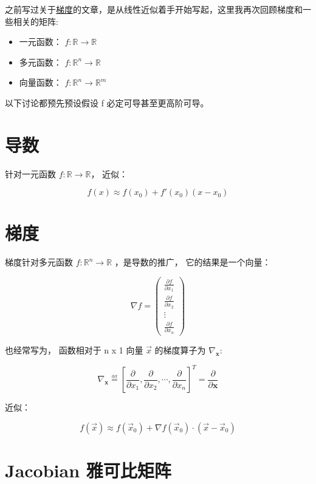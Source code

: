 \documentclass[
]{book}
\providecommand{\tightlist}{%
  \setlength{\itemsep}{0pt}\setlength{\parskip}{0pt}}
\begin{document}
之前写过关于\href{https://zhuanlan.zhihu.com/p/97545154}{梯度}的文章，是从线性近似着手开始写起，这里我再次回顾梯度和一些相关的矩阵:

\begin{itemize}
\tightlist
\item
  一元函数： \(f: \mathbb{R} \to \mathbb{R}\)
\item
  多元函数： \(f: \mathbb{R}^n \to \mathbb{R}\)
\item
  向量函数： \(f: \mathbb{R}^n \to \mathbb{R}^m\)
\end{itemize}

以下讨论都预先预设假设 f 必定可导甚至更高阶可导。

\hypertarget{ux5bfcux6570}{%
\section{导数}\label{ux5bfcux6570}}

针对一元函数 \(f: \mathbb{R} \to \mathbb{R}\)， 近似：

\[f(x) \approx f(x_0) + f'(x_0)(x-x_0)\]

\hypertarget{ux68afux5ea6}{%
\section{梯度}\label{ux68afux5ea6}}

梯度针对多元函数 \(f: \mathbb{R}^n \to \mathbb{R}\) ，是导数的推广， 它的结果是一个向量：

\[
\nabla f = \begin{pmatrix} \frac{\partial f}{\partial x_1} \\ \frac{\partial f}{\partial x_2} \\ \vdots \\ \frac{\partial f}{\partial x_n}  \end{pmatrix}
\]

也经常写为， 函数相对于 n x 1 向量 \(\vec{x}\) 的梯度算子为 \(\nabla_{\boldsymbol{x}}\):

\[
\nabla_{\boldsymbol{x}} \overset{\underset{\mathrm{def}}{}}{=} \left[ \frac{\partial }{\partial x_1}, \frac{\partial }{\partial x_2},\cdots,\frac{\partial }{\partial x_n} \right]^T=\frac{\partial }{\partial \boldsymbol{x}}
\]

近似：

\[f(\vec{x}) \approx f(\vec{x}_0) + \nabla f(\vec{x}_0) \cdot (\vec{x} - \vec{x}_0)\]

\hypertarget{jacobian-ux96c5ux53efux6bd4ux77e9ux9635}{%
\section{Jacobian 雅可比矩阵}\label{jacobian-ux96c5ux53efux6bd4ux77e9ux9635}}
\end{document}
